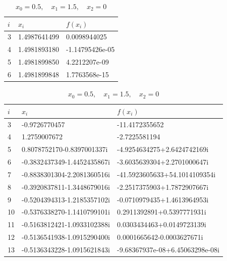 \documentclass[preprint,12pt]{elsarticle}
\begin{document}
\begin{table}[p]
    \begin{subtable}[h]{1\textwidth}
        \centering
        \begin{tabular}{l l l}
        \hline
        \textbf{$i$} & \textbf{$x_i$} & \textbf{$f(x_i)$}\\
        \hline
        3 & 1.4987641499 & 0.0098944025 \\
        4 & 1.4981893180 & -1.14795426e-05 \\
        5 & 1.4981899850 & 4.2212207e-09 \\
        6 & 1.4981899848 & 1.7763568e-15 \\
        \hline
       \end{tabular}
       \caption{$x_0=0.5,\quad x_1=1.5,\quad x_2=2$}
    \end{subtable}
    \begin{subtable}[h]{1\textwidth}
        \centering
        \begin{tabular}{l l l}
        \hline
        \textbf{$i$} & \textbf{$x_i$} & \textbf{$f(x_i)$}\\
        \hline
        3 & -0.9726770457 & -11.4172355652 \\
        4 & 1.2759007672 & -2.7225581194 \\
        5 & 0.8078752170-0.8397001337i & -4.9254634275+2.6424742169i \\
        6 & -0.3832437349-1.4452435867i & -3.6035639304+2.2701000647i \\
        7 & -0.8838301304-2.2081360516i & -41.5923605633+54.1014109354i \\
        8 & -0.3920837811-1.3448679016i & -2.2517375903+1.7872907667i \\
        9 & -0.5204394313-1.2185357102i & -0.0710979435+1.4613964953i \\
        10 & -0.5376338270-1.1410799101i & 0.2911392891+0.5397771931i \\
        11 & -0.5163812421-1.0933102388i & 0.0303434463+0.0149723139i \\
        12 & -0.5136541938-1.0915290400i & 0.0001665642-0.0003627671i \\
        13 & -0.5136343228-1.0915621843i & -9.68367937e-08+6.45063298e-08i \\
        \hline
        \end{tabular}
        \caption{$x_0=0.5,\quad x_1=1.5,\quad x_2=0$}
     \end{subtable}
     \begin{subtable}[h]{1\textwidth}

\end{subtable}
\end{table}
\end{document}
